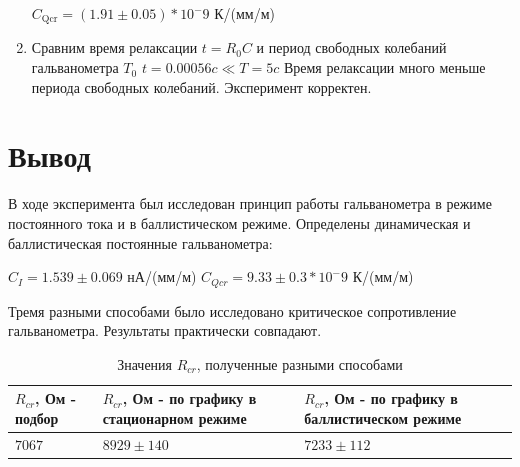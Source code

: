 \documentclass[a4paper]{article}
\begin{document}
\begin{enumerate}
\begin{center}
              $C_\text{Qcr} = (1.91 \pm 0.05) * 10^-9$ К/(мм/м)
          \end{center}

    \item Сравним время релаксации $t = R_0 C$ и период свободных колебаний гальванометра $T_0$
              $t = 0.00056 c \ll T = 5 c$
          Время релаксации много меньше периода свободных колебаний. Эксперимент корректен.

\end{enumerate}

\section{Вывод}

В ходе эксперимента был исследован принцип работы гальванометра в режиме постоянного тока и в баллистическом режиме. Определены динамическая и баллистическая постоянные гальванометра:

\begin{center}
    $C_I = 1.539 \pm 0.069$ нА/(мм/м) \hspace{1cm} $C_{Qcr}= 9.33 \pm 0.3 * 10^-9$ К/(мм/м)
\end{center}

Тремя разными способами было исследовано критическое сопротивление гальванометра. Результаты практически совпадают.

\begin{table}[h]
    \centering
    \begin{center}
        \caption{Значения $R_{cr}$, полученные разными способами}
    \end{center}
    \vspace{0.1cm}
    \label{tab:my_label}
    \begin{tabular}{ |p{4cm}|p{4cm}|p{4cm}|}
        \hline
        $R_{cr}$, Ом - подбор & $R_{cr}$, Ом  - по графику в стационарном режиме & $R_{cr}$, Ом - по графику в баллистическом режиме \\
        \hline
        $7067$                & $8929 \pm 140$                                    & $7233 \pm 112$                                      \\
        \hline
    \end{tabular}
\end{table}
\end{document}
